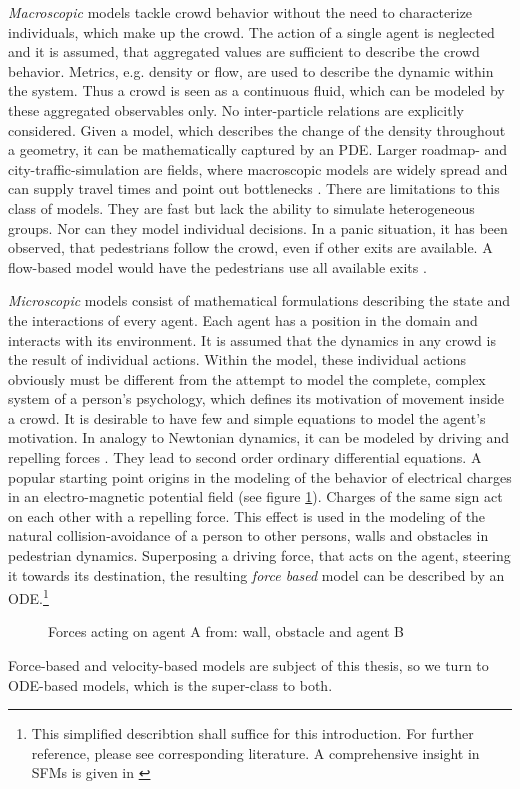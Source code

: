 \emph{Macroscopic} models tackle crowd behavior without the need to characterize individuals, which make up the crowd. The action of a single agent is neglected and it is assumed, that aggregated values are sufficient to describe the crowd behavior. Metrics, e.g. density or flow, are used to describe the dynamic within the system. Thus a crowd is seen as a continuous fluid, which can be modeled by these aggregated observables only. No inter-particle relations are explicitly considered. Given a model, which describes the change of the density throughout a geometry, it can be mathematically captured by an PDE.   Larger roadmap- and city-traffic-simulation are fields, where macroscopic models are widely spread and can supply travel times and point out bottlenecks \citep{Emme}. There are limitations to this class of models. They are fast but lack the ability to simulate heterogeneous groups. Nor can they model individual decisions. In a panic situation, it has been observed, that pedestrians follow the crowd, even if other exits are available. A flow-based model would have the pedestrians use all available exits \citep{Marno}.

\emph{Microscopic} models consist of mathematical formulations describing the state and the interactions of every agent. Each agent has a position in the domain and interacts with its environment. It is assumed that the dynamics in any crowd is the result of individual actions. Within the model, these individual actions obviously must be different from the attempt to model the complete, complex system of a person's psychology, which defines its motivation of movement inside a crowd. It is desirable to have few and simple equations to model the agent's motivation. In analogy to Newtonian dynamics, it can be modeled by driving and repelling forces \citep{Helbing2001}. They lead to second order ordinary differential equations.
A popular starting point origins in the modeling of the behavior of electrical charges in an electro-magnetic potential field (see figure \ref{forcesOnAgent}). Charges of the same sign act on each other with a repelling force. This effect is used in the modeling of the natural collision-avoidance of a person to other persons, walls and obstacles in pedestrian dynamics. Superposing a driving force, that acts on the agent, steering it towards its destination, the resulting \emph{force based} model can be described by an ODE.\footnote{This simplified describtion shall suffice for this introduction. For further reference, please see corresponding literature. A comprehensive insight in SFMs is given in \citep{Chraibi2012}}
\begin{figure}[h!]

\caption{Forces acting on agent A from: wall, obstacle and agent B}
\label{forcesOnAgent}
\end{figure}
\newline Force-based and velocity-based models are subject of this thesis, so we turn to ODE-based models, which is the super-class to both.

